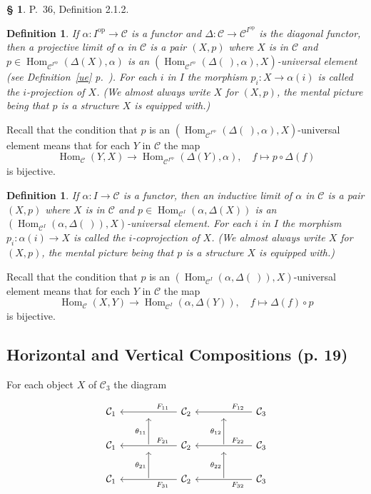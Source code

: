 \documentclass[12pt]{article}%
\newtheorem{df}[thm]{Definition}%
\theoremstyle{remark}
\theoremstyle{definition}
\newtheorem{s}[thm]{\S}%
\newcommand{\C}{\mathcal C}
\DeclareMathOperator{\Hom}{Hom}%
\DeclareMathOperator{\op}{op}
\begin{document}
\begin{s} 
P.~36, Definition 2.1.2. 
%
\begin{df}\label{p}
If $\alpha:I^{\op}\to\C$ is a functor and $\Delta:\C\to\C^{I^{\op}}$ is the diagonal functor, then a {\em projective limit of} $\alpha$ {\em in} $\C$ is a pair $(X,p)$ where $X$ is in $\C$ and $p\in\Hom_{\C^{I^{\op}}}(\Delta(X),\alpha)$ is an $(\Hom_{\C^{I^{\op}}}(\Delta(\ ),\alpha),X)$-universal element (see Definition~\ref{ue} p.~\pageref{ue}). For each $i$ in $I$ the morphism $p_i:X\to\alpha(i)$ is called the $i$-{\em projection} of $X$. (We almost always write $X$ for $(X,p)$, the mental picture being that $p$ is a structure $X$ is equipped with.)
\end{df}
%
Recall that the condition that $p$ is an $(\Hom_{\C^{I^{\op}}}(\Delta(\ ),\alpha),X)$-universal element means that for each $Y$ in $\C$ the map 
$$
\Hom_\C(Y,X)\to\Hom_{\C^{I^{\op}}}(\Delta(Y),\alpha),\quad f\mapsto p\circ\Delta(f)
$$ 
is bijective.
%
\begin{df}\label{c}
If $\alpha:I\to\C$ is a functor, then an {\em inductive limit of} $\alpha$ {\em in} $\C$ is a pair $(X,p)$ where $X$ is in $\C$ and $p\in\Hom_{\C^I}(\alpha,\Delta(X))$ is an $(\Hom_{\C^I}(\alpha,\Delta(\ )),X)$-universal element. For each $i$ in $I$ the morphism $p_i:\alpha(i)\to X$ is called the $i$-{\em coprojection}  of $X$. (We almost always write $X$ for $(X,p)$, the mental picture being that $p$ is a structure $X$ is equipped with.)
\end{df}
%
Recall that the condition that $p$ is an $(\Hom_{\C^I}(\alpha,\Delta(\ )),X)$-universal element means that for each $Y$ in $\C$ the map 
\begin{equation}\label{cue}
\Hom_\C(X,Y)\to\Hom_{\C^I}(\alpha,\Delta(Y)),\quad f\mapsto\Delta(f)\circ p
\end{equation}
is bijective.
\end{s}


\subsection{Horizontal and Vertical Compositions (p. 19)}\label{hove1}


For each object $X$ of $\C_3$ the diagram 

$$
\begin{tikzcd}
%
\C_1&{}&\C_2\ar{ll}{}[near start,swap]{F_{11}}&{}&\C_3\ar{ll}{}[near start,swap]{F_{12}}\\ 
%
\C_1&\ar{u}{\theta_{11}}&\C_2\ar{ll}{}[near start,swap]{F_{21}}&\ar{u}{\theta_{12}}&\C_3\ar{ll}{}[near start,swap]{F_{22}}\\ 
%
\C_1&\ar{u}{\theta_{21}}&\C_2\ar{ll}{}[near start]{F_{31}}&\ar{u}{\theta_{22}}&\C_3\ar{ll}{}[near start]{F_{32}}
%
\end{tikzcd}
$$ 
\end{document}
